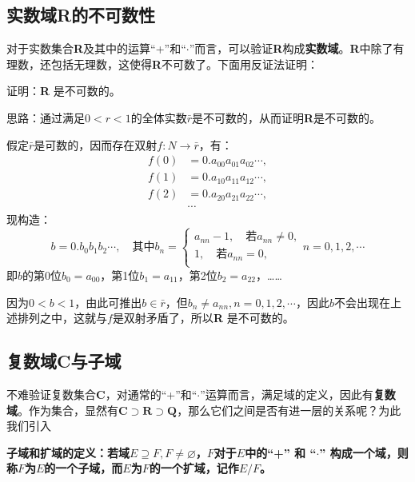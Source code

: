 \documentclass[12pt]{article}
\begin{document}
\subsection{实数域\textbf{R}的不可数性}
对于实数集合\textbf{R}及其中的运算“+”和“$\cdot$”而言，可以验证\textbf{R}构成\textbf{实数域}。\textbf{R}中除了有理数，还包括无理数，这使得\textbf{R}不可数了。下面用反证法证明：
\begin{framed}
证明：\textbf{R} 是不可数的。

思路：通过满足$0 < r < 1$的全体实数$\bar{r}$是不可数的，从而证明\textbf{R}是不可数的。

假定$\bar{r}$是可数的，因而存在双射$f: N \rightarrow \bar{r}$，有：
\begin{align*}
f(0) &= 0.a_{00}a_{01}a_{02}\cdots, \\
f(1) &= 0.a_{10}a_{11}a_{12}\cdots, \\
f(2) &= 0.a_{20}a_{21}a_{22}\cdots, \\
&\cdots
\end{align*}
现构造：
$$
b = 0.b_0b_1b_2\cdots, \quad \text{其中} 
b_n = \begin{cases}
a_{nn} - 1, \quad \text{若} a_{nn} \neq 0, \\
1, \quad \text{若} a_{nn} = 0, \\
\end{cases} n = 0, 1, 2, \cdots
$$
即$b$的第0位$b_0 = a_{00}$，第1位$b_1 = a_{11}$，第2位$b_2 = a_{22}$，……

因为$0 < b < 1$，由此可推出$b \in \bar{r}$，但$b_n \neq a_{nn}, n = 0, 1, 2, \cdots$，因此$b$不会出现在上述排列之中，这就与$f$是双射矛盾了，所以\textbf{R} 是不可数的。
\end{framed}

\subsection{复数域\textbf{C}与子域}
不难验证复数集合\textbf{C}，对通常的“+”和“$\cdot$”运算而言，满足域的定义，因此有\textbf{复数域}。作为集合，显然有$ \textbf{C} \supset \textbf{R} \supset \textbf{Q}$，那么它们之间是否有进一层的关系呢？为此我们引入
\begin{mdframed}[
linecolor=black!40,outerlinewidth=1pt,roundcorner=.5em,innertopmargin=1ex,innerbottommargin=.5\baselineskip,innerrightmargin=1em,innerleftmargin=1em,backgroundcolor=gray!5,
]
\textbf{
子域和扩域的定义：若域$E \supseteq F, F \neq \varnothing$，$F$对于$E$中的“+” 和 “$\cdot$”  构成一个域，则称$F$为$E$的一个子域，而$E$为$F$的一个扩域，记作$E/F$。
}
\end{mdframed}
\end{document}
